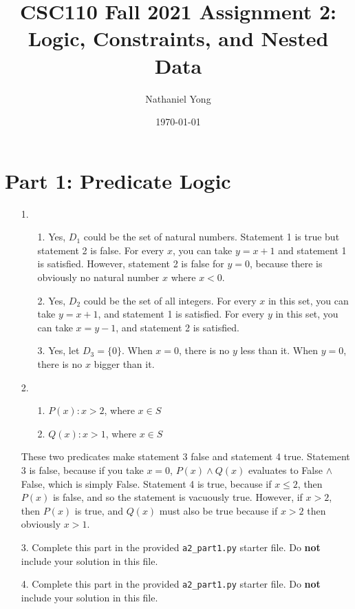\documentclass[fontsize=11pt]{article}
\title{CSC110 Fall 2021 Assignment 2: Logic, Constraints, and Nested Data}
\author{Nathaniel Yong}
\date{\today}
\begin{document}
\maketitle

\section*{Part 1: Predicate Logic}

\begin{enumerate}

\item[1.]
    \begin{enumerate}
        \item[1.] Yes, $D_1$ could be the set of natural numbers. Statement 1 is true but statement 2 is false. For every $x$, you can take $y = x + 1$ and statement 1 is satisfied. However, statement 2 is false for $y = 0$, because there is obviously no natural number $x$ where $x < 0$.
        \item[2.] Yes, $D_2$ could be the set of all integers. For every $x$ in this set, you can take $y = x + 1$, and statement 1 is satisfied. For every $y$ in this set, you can take $x = y - 1$, and statement 2 is satisfied.
        \item[3.] Yes, let $D_3=\{0\}$. When $x = 0$, there is no $y$ less than it. When $y = 0$, there is no $x$ bigger than it.
    \end{enumerate}

\item[2.]
    \begin{enumerate}
        \item[1.] $P(x): x > 2$, where $x\in S$
        \item[2.] $Q(x): x > 1$, where $x\in S$
    \end{enumerate}
    These two predicates make statement 3 false and statement 4 true. Statement 3 is false, because if you take $x = 0$, $P(x)\land Q(x)$ evaluates to False $\land$ False, which is simply False.  Statement 4 is true, because if $x\leq2$, then $P(x)$ is false, and so the statement is vacuously true. However, if $x > 2$, then $P(x)$ is true, and $Q(x)$ must also be true because if $x > 2$ then obviously $x > 1$.

\item[3.]
Complete this part in the provided \texttt{a2\_part1.py} starter file.
Do \textbf{not} include your solution in this file.

\item[4.]
Complete this part in the provided \texttt{a2\_part1.py} starter file.
Do \textbf{not} include your solution in this file.

\end{enumerate}
\end{document}
